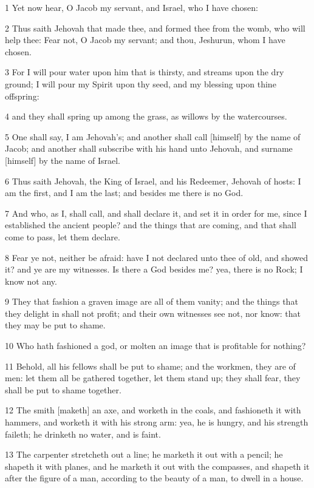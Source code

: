 \par 1 Yet now hear, O Jacob my servant, and Israel, who I have chosen:
\par 2 Thus saith Jehovah that made thee, and formed thee from the womb, who will help thee: Fear not, O Jacob my servant; and thou, Jeshurun, whom I have chosen.
\par 3 For I will pour water upon him that is thirsty, and streams upon the dry ground; I will pour my Spirit upon thy seed, and my blessing upon thine offspring:
\par 4 and they shall spring up among the grass, as willows by the watercourses.
\par 5 One shall say, I am Jehovah's; and another shall call [himself] by the name of Jacob; and another shall subscribe with his hand unto Jehovah, and surname [himself] by the name of Israel.
\par 6 Thus saith Jehovah, the King of Israel, and his Redeemer, Jehovah of hosts: I am the first, and I am the last; and besides me there is no God.
\par 7 And who, as I, shall call, and shall declare it, and set it in order for me, since I established the ancient people? and the things that are coming, and that shall come to pass, let them declare.
\par 8 Fear ye not, neither be afraid: have I not declared unto thee of old, and showed it? and ye are my witnesses. Is there a God besides me? yea, there is no Rock; I know not any.
\par 9 They that fashion a graven image are all of them vanity; and the things that they delight in shall not profit; and their own witnesses see not, nor know: that they may be put to shame.
\par 10 Who hath fashioned a god, or molten an image that is profitable for nothing?
\par 11 Behold, all his fellows shall be put to shame; and the workmen, they are of men: let them all be gathered together, let them stand up; they shall fear, they shall be put to shame together.
\par 12 The smith [maketh] an axe, and worketh in the coals, and fashioneth it with hammers, and worketh it with his strong arm: yea, he is hungry, and his strength faileth; he drinketh no water, and is faint.
\par 13 The carpenter stretcheth out a line; he marketh it out with a pencil; he shapeth it with planes, and he marketh it out with the compasses, and shapeth it after the figure of a man, according to the beauty of a man, to dwell in a house.
